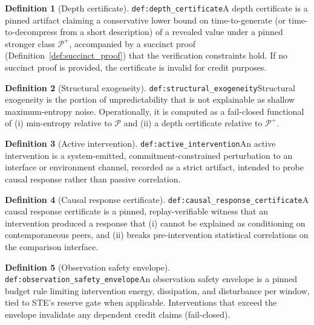 \documentclass[11pt]{article}
\theoremstyle{definition}
\newtheorem{definition}{Definition}
\theoremstyle{plain}
\newcommand{\STE}{\textsf{STE}}
\newcommand{\lbl}[1]{\texttt{\footnotesize\nolinkurl{#1}}}
\newcommand{\DefLabel}[1]{\hfill{\small\lbl{#1}}}
\begin{document}
\begin{definition}[Depth certificate]\DefLabel{def:depth_certificate}\label{def:depth_certificate}
A depth certificate is a pinned artifact claiming a conservative lower bound on time-to-generate (or time-to-decompress from a short description) of a revealed value under a pinned stronger class $\mathcal{P}^+$, accompanied by a succinct proof (Definition~\ref{def:succinct_proof}) that the verification constraints hold.
If no succinct proof is provided, the certificate is invalid for credit purposes.
\end{definition}

\begin{definition}[Structural exogeneity]\DefLabel{def:structural_exogeneity}\label{def:structural_exogeneity}
Structural exogeneity is the portion of unpredictability that is not explainable as shallow maximum-entropy noise.
Operationally, it is computed as a fail-closed functional of (i) min-entropy relative to $\mathcal{P}$ and (ii) a depth certificate relative to $\mathcal{P}^+$.
\end{definition}

\begin{definition}[Active intervention]\DefLabel{def:active_intervention}\label{def:active_intervention}
An active intervention is a system-emitted, commitment-constrained perturbation to an interface or environment channel, recorded as a strict artifact, intended to probe causal response rather than passive correlation.
\end{definition}

\begin{definition}[Causal response certificate]\DefLabel{def:causal_response_certificate}\label{def:causal_response_certificate}
A causal response certificate is a pinned, replay-verifiable witness that an intervention produced a response that (i) cannot be explained as conditioning on contemporaneous peers, and (ii) breaks pre-intervention statistical correlations on the comparison interface.
\end{definition}

\begin{definition}[Observation safety envelope]\DefLabel{def:observation_safety_envelope}\label{def:observation_safety_envelope}
An observation safety envelope is a pinned budget rule limiting intervention energy, dissipation, and disturbance per window, tied to \STE{}'s reserve gate when applicable.
Interventions that exceed the envelope invalidate any dependent credit claims (fail-closed).
\end{definition}
\end{document}
